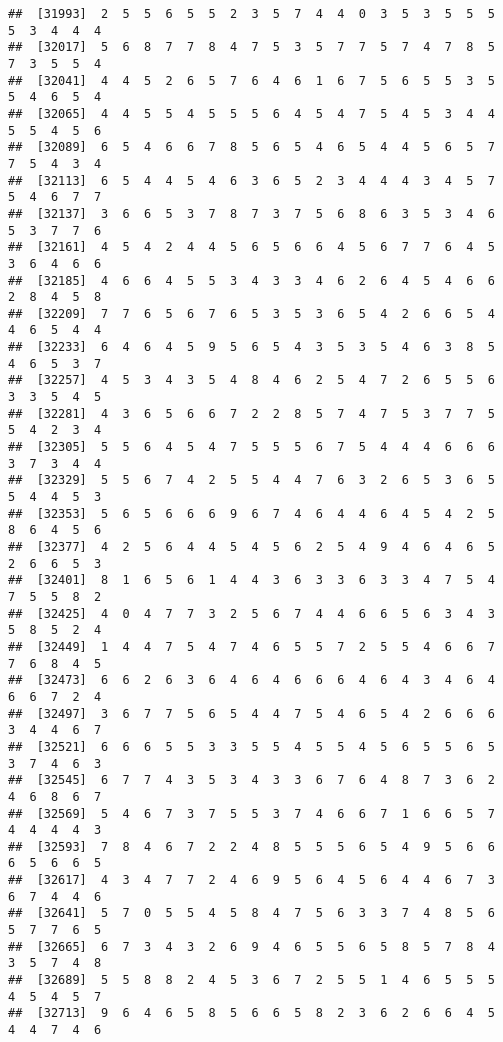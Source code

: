 \documentclass[
]{book}
\begin{document}
\begin{verbatim}
##  [31993]  2  5  5  6  5  5  2  3  5  7  4  4  0  3  5  3  5  5  5  5  3  4  4  4
##  [32017]  5  6  8  7  7  8  4  7  5  3  5  7  7  5  7  4  7  8  5  7  3  5  5  4
##  [32041]  4  4  5  2  6  5  7  6  4  6  1  6  7  5  6  5  5  3  5  5  4  6  5  4
##  [32065]  4  4  5  5  4  5  5  5  6  4  5  4  7  5  4  5  3  4  4  5  5  4  5  6
##  [32089]  6  5  4  6  6  7  8  5  6  5  4  6  5  4  4  5  6  5  7  7  5  4  3  4
##  [32113]  6  5  4  4  5  4  6  3  6  5  2  3  4  4  4  3  4  5  7  5  4  6  7  7
##  [32137]  3  6  6  5  3  7  8  7  3  7  5  6  8  6  3  5  3  4  6  5  3  7  7  6
##  [32161]  4  5  4  2  4  4  5  6  5  6  6  4  5  6  7  7  6  4  5  3  6  4  6  6
##  [32185]  4  6  6  4  5  5  3  4  3  3  4  6  2  6  4  5  4  6  6  2  8  4  5  8
##  [32209]  7  7  6  5  6  7  6  5  3  5  3  6  5  4  2  6  6  5  4  4  6  5  4  4
##  [32233]  6  4  6  4  5  9  5  6  5  4  3  5  3  5  4  6  3  8  5  4  6  5  3  7
##  [32257]  4  5  3  4  3  5  4  8  4  6  2  5  4  7  2  6  5  5  6  3  3  5  4  5
##  [32281]  4  3  6  5  6  6  7  2  2  8  5  7  4  7  5  3  7  7  5  5  4  2  3  4
##  [32305]  5  5  6  4  5  4  7  5  5  5  6  7  5  4  4  4  6  6  6  3  7  3  4  4
##  [32329]  5  5  6  7  4  2  5  5  4  4  7  6  3  2  6  5  3  6  5  5  4  4  5  3
##  [32353]  5  6  5  6  6  6  9  6  7  4  6  4  4  6  4  5  4  2  5  8  6  4  5  6
##  [32377]  4  2  5  6  4  4  5  4  5  6  2  5  4  9  4  6  4  6  5  2  6  6  5  3
##  [32401]  8  1  6  5  6  1  4  4  3  6  3  3  6  3  3  4  7  5  4  7  5  5  8  2
##  [32425]  4  0  4  7  7  3  2  5  6  7  4  4  6  6  5  6  3  4  3  5  8  5  2  4
##  [32449]  1  4  4  7  5  4  7  4  6  5  5  7  2  5  5  4  6  6  7  7  6  8  4  5
##  [32473]  6  6  2  6  3  6  4  6  4  6  6  6  4  6  4  3  4  6  4  6  6  7  2  4
##  [32497]  3  6  7  7  5  6  5  4  4  7  5  4  6  5  4  2  6  6  6  3  4  4  6  7
##  [32521]  6  6  6  5  5  3  3  5  5  4  5  5  4  5  6  5  5  6  5  3  7  4  6  3
##  [32545]  6  7  7  4  3  5  3  4  3  3  6  7  6  4  8  7  3  6  2  4  6  8  6  7
##  [32569]  5  4  6  7  3  7  5  5  3  7  4  6  6  7  1  6  6  5  7  4  4  4  4  3
##  [32593]  7  8  4  6  7  2  2  4  8  5  5  5  6  5  4  9  5  6  6  6  5  6  6  5
##  [32617]  4  3  4  7  7  2  4  6  9  5  6  4  5  6  4  4  6  7  3  6  7  4  4  6
##  [32641]  5  7  0  5  5  4  5  8  4  7  5  6  3  3  7  4  8  5  6  5  7  7  6  5
##  [32665]  6  7  3  4  3  2  6  9  4  6  5  5  6  5  8  5  7  8  4  3  5  7  4  8
##  [32689]  5  5  8  8  2  4  5  3  6  7  2  5  5  1  4  6  5  5  5  4  5  4  5  7
##  [32713]  9  6  4  6  5  8  5  6  6  5  8  2  3  6  2  6  6  4  5  4  4  7  4  6

\end{verbatim}
\end{document}
